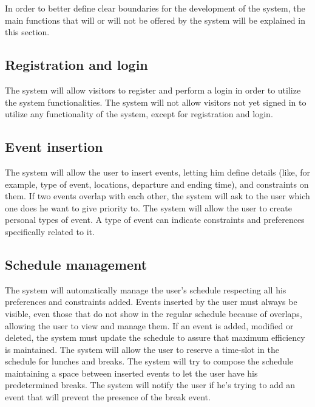 In order to better define clear boundaries for the development of the system, the main functions that  will or will not be offered by the system will be explained in this section.

\subsection{Registration and login}
The system will allow visitors to register and perform a login in order to utilize the system functionalities. 
\newline
The system will not allow visitors not yet signed in to utilize any functionality of the system, except for registration and login.

\subsection{Event insertion}
The system will allow the user to insert events, letting him define details (like, for example, type of event, locations, departure and ending time), and constraints on them.
\newline
If two events overlap with each other, the system will ask to the user which one does he want to give priority to.
\newline
The system will allow the user to create personal types of event.
A type of event can indicate constraints and preferences specifically related to it.

\subsection{Schedule management}
The system will automatically manage the user's schedule respecting all his preferences and constraints added.
\newline
Events inserted by the user must always be visible, even those that do not show in the regular schedule because of overlaps, allowing the user to view and manage them.
\newline
If an event is added, modified or deleted, the system must update the schedule to assure that maximum efficiency is maintained.
\newline
The system will allow the user to reserve a time-slot in the schedule for lunches and breaks. 
\newline
The system will try to compose the schedule maintaining a space between inserted events to let the user have his predetermined breaks.
\newline
The system will notify the user if he's trying to add an event that will prevent the presence of the break event.

